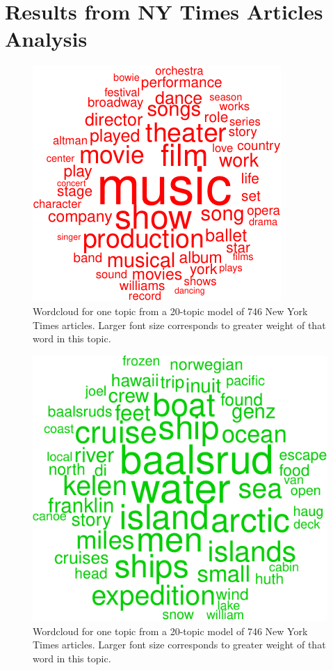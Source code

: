 \documentclass[12pt,]{article}
\begin{document}
\section{Results from NY Times Articles
Analysis}\label{results-from-ny-times-articles-analysis}

\begin{figure}
\includegraphics[width=\textwidth]{lda-tutorial-2016_files/figure-latex/wordcloud1-1.pdf}
\caption{Wordcloud for one topic from a 20-topic model of 746 New York Times articles. Larger font size corresponds to greater weight of that word in this topic.\label{fig:wc1}}
\end{figure}

\begin{figure}
\includegraphics[width=\textwidth]{lda-tutorial-2016_files/figure-latex/wordcloud1-2.pdf}
\caption{Wordcloud for one topic from a 20-topic model of 746 New York Times articles. Larger font size corresponds to greater weight of that word in this topic.\label{fig:wc2}}
\end{figure}
\end{document}
